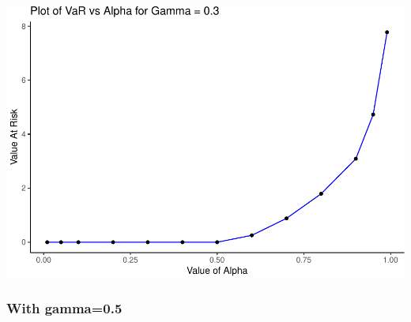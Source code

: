 \documentclass[]{article}
\begin{document}
\includegraphics{Integrated_Management_Formulation_Model_files/figure-latex/unnamed-chunk-13-1.pdf}

\subsubsection{With gamma=0.5}\label{with-gamma0.5}
\end{document}
